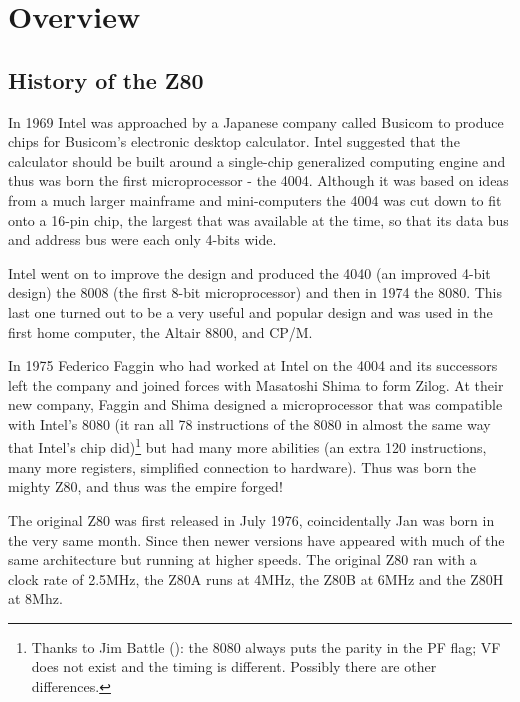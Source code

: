 \newcommand{\TwoColumnInstr}[2]{
	#1 & #2 \\
}

\pagebreak
\section{Overview}
\subsection{History of the Z80}

In 1969 Intel was approached by a Japanese company called Busicom to produce chips for Busicom's electronic desktop calculator. Intel suggested that the calculator should be built around a single-chip generalized computing engine and thus was born the first microprocessor - the 4004. Although it was based on ideas from a much larger mainframe and mini-computers the 4004 was cut down to fit onto a 16-pin chip, the largest that was available at the time, so that its data bus and address bus were each only 4-bits wide. 

Intel went on to improve the design and produced the 4040 (an improved 4-bit design) the 8008 (the first 8-bit microprocessor) and then in 1974 the 8080. This last one turned out to be a very useful and popular design and was used in the first home computer, the Altair 8800, and CP/M. 

In 1975 Federico Faggin who had worked at Intel on the 4004 and its successors left the company and joined forces with Masatoshi Shima to form Zilog. At their new company, Faggin and Shima designed a microprocessor that was compatible with Intel's 8080 (it ran all 78 instructions of the 8080 in almost the same way that Intel's chip did)\footnote{Thanks to Jim Battle (): the 8080 always puts the parity in the PF flag; VF does not exist and the timing is different. Possibly there are other differences.} but had many more abilities (an extra 120 instructions, many more registers, simplified connection to hardware). Thus was born the mighty Z80, and thus was the empire forged!

The original Z80 was first released in July 1976, coincidentally Jan was born in the very same month. Since then newer versions have appeared with much of the same architecture but running at higher speeds. The original Z80 ran with a clock rate of 2.5MHz, the Z80A runs at 4MHz, the Z80B at 6MHz and the Z80H at 8Mhz. 

